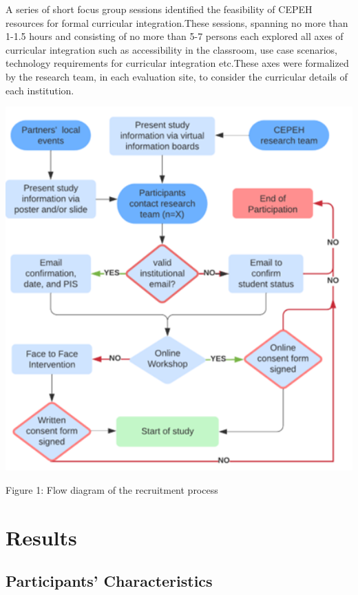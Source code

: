 \documentclass[a4paper, nobind]{templates/ociamthesis}
\begin{document}
A series of short focus group sessions identified the feasibility of CEPEH resources for formal curricular integration.These sessions, spanning no more than 1-1.5 hours and consisting of no more than 5-7 persons each explored all axes of curricular integration such as accessibility in the classroom, use case scenarios, technology requirements for curricular integration etc.These axes were formalized by the research team, in each evaluation site, to consider the curricular details of each institution.

\includegraphics[width=5.76in]{untitled-1}

Figure 1: Flow diagram of the recruitment process

\hypertarget{rmd-basics}{%
\chapter{Results}\label{rmd-basics}}

\minitoc 

\noindent

\hypertarget{participants-characteristics}{%
\section{Participants' Characteristics}\label{participants-characteristics}}
\end{document}
